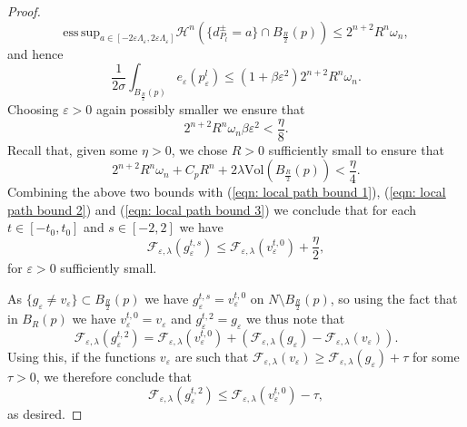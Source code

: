 \documentclass[11pt]{article}
\newcommand{\esssup}{\mathrm{ess\, sup}}
\begin{document}
\begin{proof}
\begin{equation*}
    {\esssup}_{a \in [-2\varepsilon\Lambda_\varepsilon, 2\varepsilon\Lambda_\varepsilon]}\mathcal{H}^n(\{d^\pm_{P_l} = a\} \cap B_{\frac{R}{2}}(p)) \leq 2^{n+2}R^n\omega_n,
\end{equation*}
and hence
\begin{equation}\label{eqn: local path bound 3}
    \frac{1}{2\sigma}\int_{{B_\frac{R}{2}}(p)} e_\varepsilon(p^l_\varepsilon) \leq  (1 + \beta \varepsilon^2)2^{n+2}R^n\omega_n.
\end{equation}
Choosing $\varepsilon > 0$ again possibly smaller we ensure that
\begin{equation*}
   2^{n+2}R^n\omega_n   \beta \varepsilon^2 < \frac{\eta}{8}.
\end{equation*}
Recall that, given some $\eta > 0$, we chose $R > 0$ sufficiently small to ensure that
\begin{equation*}
     2^{n+2}R^n\omega_n + C_pR^n + 2\lambda \mathrm{Vol}(B_{\frac{R}{2}}(p)) < \frac{\eta}{4}.
\end{equation*}
Combining the above two bounds with (\ref{eqn: local path bound 1}), (\ref{eqn: local path bound 2}) and (\ref{eqn: local path bound 3}) we conclude that for each $t \in [-t_0,t_0]$ and $s \in [-2,2]$ we have
\begin{equation*}
    \mathcal{F}_{\varepsilon,\lambda}(g^{t,s}_\varepsilon) \leq  \mathcal{F}_{\varepsilon,\lambda}(v^{t,0}_\varepsilon) + \frac{\eta}{2},
\end{equation*}
for $\varepsilon > 0$ sufficiently small. 

\bigskip

As $\{ g_\varepsilon \neq v_\varepsilon \} \subset B_{\frac{R}{2}}(p)$ we have $g^{t,s}_\varepsilon = v^{t,0}_\varepsilon$ on $N \setminus B_{\frac{R}{2}}(p)$, so using the fact that in $B_R(p)$ we have $v^{t,0}_\varepsilon = v_\varepsilon$ and $g^{t,2}_\varepsilon = g_\varepsilon$ we thus note that
\begin{equation*}
    \mathcal{F}_{\varepsilon,\lambda}(g^{t,2}_\varepsilon) = \mathcal{F}_{\varepsilon,\lambda}(v^{t,0}_\varepsilon) + (\mathcal{F}_{\varepsilon,\lambda}(g_\varepsilon) - \mathcal{F}_{\varepsilon,\lambda}(v_\varepsilon)).
\end{equation*}
Using this, if the functions $v_\varepsilon$ are such that $\mathcal{F}_{\varepsilon,\lambda}(v_\varepsilon) \geq \mathcal{F}_{\varepsilon,\lambda}(g_\varepsilon) + \tau$ for some $\tau > 0$, we therefore conclude that
\begin{equation*}
    \mathcal{F}_{\varepsilon,\lambda}(g^{t,2}_\varepsilon) \leq  \mathcal{F}_{\varepsilon,\lambda}(v^{t,0}_\varepsilon) -\tau,
\end{equation*}
as desired.
\end{proof}
\end{document}

